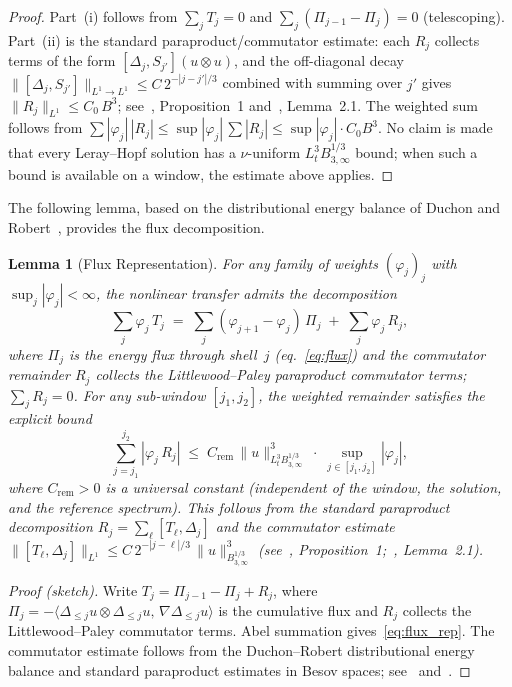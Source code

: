 \documentclass[12pt,a4paper]{article}
\theoremstyle{breakdef}
\theoremstyle{breakplain}
\newtheorem{lemma}[definition]{Lemma}
\theoremstyle{breakdef}
\begin{document}
\begin{proof}
Part~(i) follows from $\sum_j T_j = 0$ and $\sum_j(\Pi_{j-1}-\Pi_j)=0$
(telescoping). Part~(ii) is the standard paraproduct/commutator estimate:
each $R_j$ collects terms of the form $[\Delta_j, S_{j'}](u \otimes u)$,
and the off-diagonal decay $\|[\Delta_j, S_{j'}]\|_{L^1 \to L^1}
\le C\,2^{-|j-j'|/3}$ combined with summing over $j'$ gives $\|R_j\|_{L^1}
\le C_0\,B^3$; see~\cite{CET94}, Proposition~1 and~\cite{DR00},
Lemma~2.1. The weighted sum follows from
$\sum |{\varphi_j}|\,|{R_j}| \le \sup|\varphi_j|\,\sum|R_j|
  \le \sup|\varphi_j|\cdot C_0 B^3$. No claim is made that every
Leray--Hopf solution has a $\nu$-uniform $L^3_tB^{1/3}_{3,\infty}$ bound;
when such a bound is available on a window, the estimate above applies.
\end{proof}

The following lemma, based on the distributional energy balance of
Duchon and Robert~\cite{DR00}, provides the flux decomposition.

\begin{lemma}[Flux Representation]\label{lem:flux}
For any family of weights $(\varphi_j)_j$ with $\sup_j |\varphi_j| < \infty$,
the nonlinear transfer admits the decomposition
\begin{equation}\label{eq:flux_rep}
  \sum_j \varphi_j\,T_j
  \;=\;
  \sum_j (\varphi_{j+1} - \varphi_j)\,\Pi_j
  \;+\;
  \sum_j \varphi_j\,R_j,
\end{equation}
where $\Pi_j$ is the energy flux through shell~$j$
(eq.~\eqref{eq:flux}) and the commutator remainder $R_j$ collects the
Littlewood--Paley paraproduct commutator terms; $\sum_j R_j = 0$.
For any sub-window $[j_1, j_2]$, the weighted remainder satisfies the
\emph{explicit bound}
\begin{equation}\label{eq:remainder-bound}
  \sum_{j=j_1}^{j_2} |\varphi_j\,R_j|
  \;\le\;
  C_{\mathrm{rem}}\,\|u\|_{L^3_t B^{1/3}_{3,\infty}}^3
  \;\cdot\;
  \sup_{j \in [j_1,j_2]} |\varphi_j|,
\end{equation}
where $C_{\mathrm{rem}} > 0$ is a universal constant (independent of the
window, the solution, and the reference spectrum).  This follows from the
standard paraproduct decomposition $R_j = \sum_{\ell} [T_\ell,
\Delta_j]$ and the commutator estimate $\|[T_\ell, \Delta_j]\|_{L^1}
\le C\,2^{-|j-\ell|/3}\,\|u\|_{B^{1/3}_{3,\infty}}^3$
(see~\cite{CET94}, Proposition~1;~\cite{DR00}, Lemma~2.1).
\end{lemma}

\begin{proof}[Proof (sketch)]
Write $T_j = \Pi_{j-1} - \Pi_j + R_j$, where
$\Pi_j = -\langle \Delta_{\le j} u \otimes \Delta_{\le j} u,\,
\nabla \Delta_{\le j} u \rangle$ is the cumulative flux
and $R_j$ collects the Littlewood--Paley commutator terms.
Abel summation gives~\eqref{eq:flux_rep}.  The commutator estimate
follows from the Duchon--Robert distributional energy balance and
standard paraproduct estimates in Besov spaces; see~\cite{DR00}
and~\cite{CET94}.
\end{proof}
\end{document}
